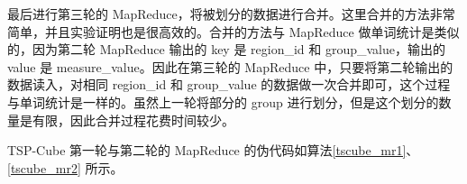 最后进行第三轮的 MapReduce，将被划分的数据进行合并。这里合并的方法非常简单，并且实验证明也是很高效的。合并的方法与 MapReduce 做单词统计是类似的，因为第二轮 MapReduce 输出的 key 是 region\_id 和 group\_value，输出的 value 是 measure\_value。因此在第三轮的 MapReduce 中，只要将第二轮输出的数据读入，对相同 region\_id 和 group\_value 的数据做一次合并即可，这个过程与单词统计是一样的。虽然上一轮将部分的 group 进行划分，但是这个划分的数量是有限，因此合并过程花费时间较少。


TSP-Cube 第一轮与第二轮的 MapReduce 的伪代码如算法\ref{tscube_mr1}、\ref{tscube_mr2} 所示。






